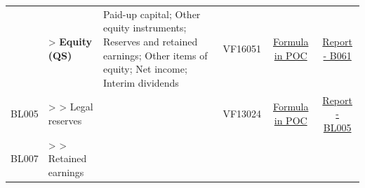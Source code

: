 \documentclass[]{book}
\begin{document}
\begin{longtable}[]{@{}cllccc@{}}
\begin{minipage}[t]{0.08\columnwidth}
\end{minipage} & \begin{minipage}[t]{0.20\columnwidth}\raggedright
\textgreater{} \textbf{Equity (QS)}\strut
\end{minipage} & \begin{minipage}[t]{0.16\columnwidth}\raggedright
Paid-up capital; Other equity instruments; Reserves and retained earnings; Other items of equity; Net income; Interim dividends\strut
\end{minipage} & \begin{minipage}[t]{0.09\columnwidth}\centering
VF16051\strut
\end{minipage} & \begin{minipage}[t]{0.15\columnwidth}\centering
\protect\hyperlink{b061---formula-in-poc}{Formula in POC}\strut
\end{minipage} & \begin{minipage}[t]{0.16\columnwidth}\centering
\href{./Auxiliary\%20Files/technical_reports/variable_report/B061.pdf}{Report - B061}\strut
\end{minipage}\tabularnewline
\begin{minipage}[t]{0.08\columnwidth}\centering
BL005\strut
\end{minipage} & \begin{minipage}[t]{0.20\columnwidth}\raggedright
\textgreater{} \textgreater{} Legal reserves\strut
\end{minipage} & \begin{minipage}[t]{0.16\columnwidth}\raggedright
\strut
\end{minipage} & \begin{minipage}[t]{0.09\columnwidth}\centering
VF13024\strut
\end{minipage} & \begin{minipage}[t]{0.15\columnwidth}\centering
\protect\hyperlink{bl005---formula-in-poc}{Formula in POC}\strut
\end{minipage} & \begin{minipage}[t]{0.16\columnwidth}\centering
\href{./Auxiliary\%20Files/technical_reports/variable_report/BL005(!).pdf}{Report - BL005}\strut
\end{minipage}\tabularnewline
\begin{minipage}[t]{0.08\columnwidth}\centering
BL007\strut
\end{minipage} & \begin{minipage}[t]{0.20\columnwidth}\raggedright
\textgreater{} \textgreater{} Retained earnings\strut
\end{minipage} & \begin{minipage}[t]{0.16\columnwidth}\raggedright

\end{minipage}
\end{longtable}
\end{document}
